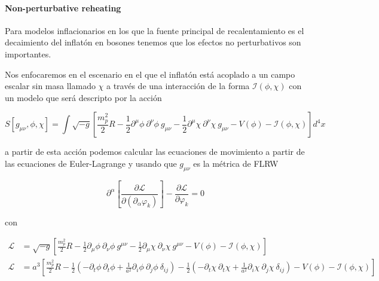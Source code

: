 \paragraph{Non-perturbative reheating}

Para modelos inflacionarios en los que la fuente principal de recalentamiento es el decaimiento del inflatón en bosones tenemos que los efectos no perturbativos son importantes.

Nos enfocaremos en el escenario en el que el inflatón está acoplado a un campo escalar sin masa llamado $\chi$ a través de una interacción de la forma $\mathcal{I} (\phi, \chi)$ con un modelo que será descripto por la acción

\begin{equation}
    S [g_{\mu\nu}, \phi, \chi] = \int \sqrt{-g} \left[ \frac{m_p^2}{2} R - \frac{1}{2} \partial^\mu \phi \ \partial^\nu \phi \ g_{\mu \nu} - \frac{1}{2} \partial^\mu \chi \ \partial^\nu \chi \ g_{\mu \nu} - V(\phi) - \mathcal{I} (\phi, \chi) \right] d^4 x
\end{equation}

\noindent
a partir de esta acción podemos calcular las ecuaciones de movimiento a partir de las ecuaciones de Euler-Lagrange y usando que $g_{\mu \nu}$ es la métrica de FLRW

\begin{equation}
    \partial^\alpha \left[ \frac{\partial \mathcal{L}}{\partial (\partial_\alpha \varphi_k)} \right] - \frac{\partial \mathcal{L}}{\partial \varphi_k} = 0
\end{equation}

\noindent
con

\begin{equation*}
    \begin{split}
        \mathcal{L} &= \sqrt{-g} \left[ \frac{m_p^2}{2} R - \frac{1}{2} \partial_\mu \phi \ \partial_\nu \phi \ g^{\mu \nu} - \frac{1}{2} \partial_\mu \chi \ \partial_\nu \chi \ g^{\mu \nu} - V(\phi) - \mathcal{I} (\phi, \chi) \right]\\
        \mathcal{L} &= a^3 \left[ \frac{m_p^2}{2} R - \frac{1}{2} \left( - \partial_t \phi \ \partial_t \phi + \frac{1}{a^2} \partial_i \phi \ \partial_j \phi \ \delta_{ij} \right) - \frac{1}{2} \left( - \partial_t \chi \ \partial_t \chi + \frac{1}{a^2} \partial_i \chi \ \partial_j \chi \ \delta_{ij} \right) - V(\phi) - \mathcal{I} (\phi, \chi) \right]
    \end{split}
\end{equation*}

